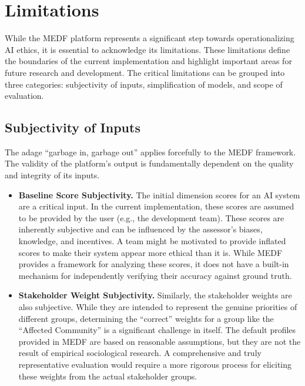 \chapter{Limitations}
\label{ch:limitations}

While the MEDF platform represents a significant step towards operationalizing AI ethics, it is essential to acknowledge its limitations. These limitations define the boundaries of the current implementation and highlight important areas for future research and development. The critical limitations can be grouped into three categories: subjectivity of inputs, simplification of models, and scope of evaluation.

\section{Subjectivity of Inputs}
\label{sec:subjectivity}

The adage \enquote{garbage in, garbage out} applies forcefully to the MEDF framework. The validity of the platform's output is fundamentally dependent on the quality and integrity of its inputs.

\begin{itemize}[leftmargin=2em]
  \item \textbf{Baseline Score Subjectivity.} The initial dimension scores for an AI system are a critical input. In the current implementation, these scores are assumed to be provided by the user (e.g., the development team). These scores are inherently subjective and can be influenced by the assessor's biases, knowledge, and incentives. A team might be motivated to provide inflated scores to make their system appear more ethical than it is. While MEDF provides a framework for analyzing these scores, it does not have a built-in mechanism for independently verifying their accuracy against ground truth.

  \item \textbf{Stakeholder Weight Subjectivity.} Similarly, the stakeholder weights are also subjective. While they are intended to represent the genuine priorities of different groups, determining the \enquote{correct} weights for a group like the \enquote{Affected Community} is a significant challenge in itself. The default profiles provided in MEDF are based on reasonable assumptions, but they are not the result of empirical sociological research. A comprehensive and truly representative evaluation would require a more rigorous process for eliciting these weights from the actual stakeholder groups.
\end{itemize}

